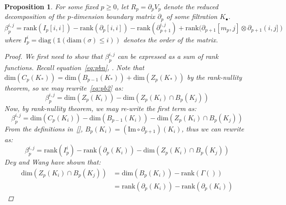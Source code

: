 \documentclass[10pt]{article}
\newtheorem{proposition}{Proposition}
\begin{document}
\begin{proposition}
For some fixed $p \geq 0$, let $R_p = \partial_p V_p$ denote the reduced decomposition of the $p$-dimension boundary matrix $\partial_p$ of some filtration $K_\bullet$.  
	\begin{equation}\label{eq:betti_four}
	\beta_p^{i,j} = \mathrm{rank}(I_p[i,i]) - \mathrm{rank}(\partial_p[i,i]) - \mathrm{rank}(\partial_{p+1}^{i,j}) + \mathrm{rank}(\partial_{p+1}[m_p, j] \otimes\partial_{p+1}(i, j] )
	\end{equation}
where $I_p^i = \mathrm{diag}(\mathds{1}(\mathrm{diam}(\sigma) \leq i))$ denotes the order of the matrix.
\begin{proof}
We first need to show that $\beta_p^{i,j}$ can be expressed as a sum of rank functions. Recall equation~\ref{eq:pbn}, . Note that $\mathrm{dim}(C_p(K_\ast)) = \mathrm{dim}(B_{p-1}(K_\ast)) + \mathrm{dim}(Z_p(K_\ast))$ by the rank-nullity theorem, so we may rewrite~\eqref{eq:pb2} as:
$$ \beta_p^{i,j} = \mathrm{dim} \left( Z_p(K_i) \right) - \mathrm{dim}\left( Z_p(K_i) \cap B_p(K_j) \right ) $$
Now, by rank-nullity theorem, we may re-write the first term as: 
$$ \beta_p^{i,j} = \mathrm{dim} \left( C_p(K_i) \right) - \mathrm{dim} \left( B_{p-1}(K_i) \right) - \mathrm{dim}\left( Z_p(K_i) \cap B_p(K_j) \right ) $$
From the definitions in~\ref{}, $B_p(K_i) = (\mathrm{Im} \circ \partial_{p+1})(K_i)$, thus we can rewrite as:  
$$ \beta_p^{i,j} = \mathrm{rank}(I_p^i) - \mathrm{rank}(\partial_p(K_i)) - \mathrm{dim}\left( Z_p(K_i) \cap B_p(K_j) \right ) $$
Dey and Wang have shown that:
\begin{align*}
	\mathrm{dim}(Z_p(K_i) \cap B_p(K_j))  &= \mathrm{dim}(B_p(K_i)) - \mathrm{rank}(\Gamma()) \\
	&= \mathrm{rank}(\partial_p(K_i)) - \mathrm{rank}(\partial_p(K_i))
\end{align*}
\end{proof}
\end{proposition}
\end{document}
